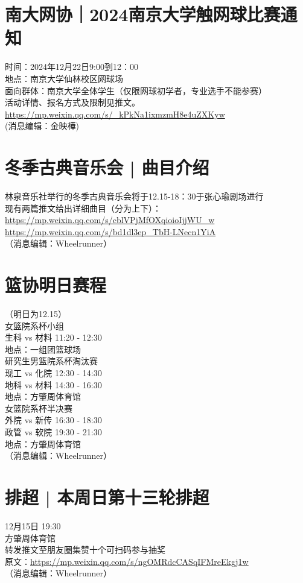 \documentclass[letterpaper, 12pt]{article}
\begin{document}
\begin{multicols}{2}
\section{南大网协｜2024南京大学触网球比赛通知}
时间：2024年12月22日9:00到12：00\\
地点：南京大学仙林校区网球场\\
面向群体：南京大学全体学生（仅限网球初学者，专业选手不能参赛）\\
活动详情、报名方式及限制见推文。\\
\url{https://mp.weixin.qq.com/s/_kPkNa1ixmzmH8e4uZXKyw}\\
(消息编辑：金映樺)

\section{冬季古典音乐会 | 曲目介绍}
林泉音乐社举行的冬季古典音乐会将于12.15-18：30于张心瑜剧场进行\\
现有两篇推文给出详细曲目（分为上下）：\\
\url{https://mp.weixin.qq.com/s/cblVPjMfOXqioioIjjWU_w}\\
\url{https://mp.weixin.qq.com/s/bd1dl3ep_TbH-LNecn1YiA}\\
（消息编辑：Wheelrunner）

\section{篮协明日赛程}
（明日为12.15）\\
女篮院系杯小组\\
生科 vs 材料 11:20 - 12:30\\
地点：一组团篮球场\\
研究生男篮院系杯淘汰赛\\
现工 vs 化院 12:30 - 14:30\\
地科 vs 材料 14:30 - 16:30\\
地点：方肇周体育馆\\
女篮院系杯半决赛\\
外院 vs 新传 16:30 - 18:30\\
政管 vs 软院 19:30 - 21:30\\
地点：方肇周体育馆\\
（消息编辑：Wheelrunner）

\section{排超 | 本周日第十三轮排超}
12月15日 19:30\\
方肇周体育馆\\
转发推文至朋友圈集赞十个可扫码参与抽奖\\
原文：\url{https://mp.weixin.qq.com/s/ngOMRdcCASqIFMreEkgj1w}\\
（消息编辑：Wheelrunner）



\end{multicols}
\end{document}
